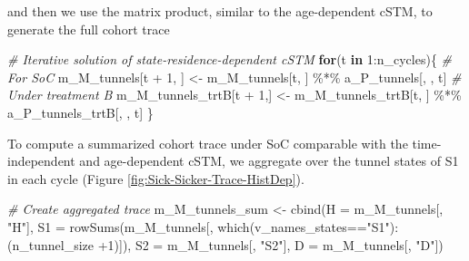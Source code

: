 \documentclass[
]{article}
\newenvironment{Shaded}{\begin{snugshade}}{\end{snugshade}}
\newcommand{\AttributeTok}[1]{\textcolor[rgb]{0.77,0.63,0.00}{#1}}
\newcommand{\CommentTok}[1]{\textcolor[rgb]{0.56,0.35,0.01}{\textit{#1}}}
\newcommand{\ControlFlowTok}[1]{\textcolor[rgb]{0.13,0.29,0.53}{\textbf{#1}}}
\newcommand{\DecValTok}[1]{\textcolor[rgb]{0.00,0.00,0.81}{#1}}
\newcommand{\FunctionTok}[1]{\textcolor[rgb]{0.00,0.00,0.00}{#1}}
\newcommand{\NormalTok}[1]{#1}
\newcommand{\OtherTok}[1]{\textcolor[rgb]{0.56,0.35,0.01}{#1}}
\newcommand{\SpecialCharTok}[1]{\textcolor[rgb]{0.00,0.00,0.00}{#1}}
\newcommand{\StringTok}[1]{\textcolor[rgb]{0.31,0.60,0.02}{#1}}
\begin{document}
and then we use the matrix product, similar to the age-dependent cSTM, to generate the full cohort trace

\begin{Shaded}
\begin{Highlighting}[]
\CommentTok{\# Iterative solution of state{-}residence{-}dependent cSTM}
\ControlFlowTok{for}\NormalTok{(t }\ControlFlowTok{in} \DecValTok{1}\SpecialCharTok{:}\NormalTok{n\_cycles)\{}
  \CommentTok{\# For SoC}
\NormalTok{  m\_M\_tunnels[t }\SpecialCharTok{+} \DecValTok{1}\NormalTok{, ] }\OtherTok{\textless{}{-}}\NormalTok{ m\_M\_tunnels[t, ] }\SpecialCharTok{\%*\%}\NormalTok{ a\_P\_tunnels[, , t]}
  \CommentTok{\# Under treatment B}
\NormalTok{  m\_M\_tunnels\_trtB[t }\SpecialCharTok{+} \DecValTok{1}\NormalTok{,] }\OtherTok{\textless{}{-}}\NormalTok{ m\_M\_tunnels\_trtB[t, ] }\SpecialCharTok{\%*\%}\NormalTok{ a\_P\_tunnels\_trtB[, , t]}
\NormalTok{\}}
\end{Highlighting}
\end{Shaded}

To compute a summarized cohort trace under SoC comparable with the time-independent and age-dependent cSTM, we aggregate over the tunnel states of S1 in each cycle (Figure \ref{fig:Sick-Sicker-Trace-HistDep}).

\begin{Shaded}
\begin{Highlighting}[]
\CommentTok{\# Create aggregated trace}
\NormalTok{m\_M\_tunnels\_sum }\OtherTok{\textless{}{-}} \FunctionTok{cbind}\NormalTok{(}\AttributeTok{H =}\NormalTok{ m\_M\_tunnels[, }\StringTok{"H"}\NormalTok{], }
                         \AttributeTok{S1 =} \FunctionTok{rowSums}\NormalTok{(m\_M\_tunnels[, }\FunctionTok{which}\NormalTok{(v\_names\_states}\SpecialCharTok{==}\StringTok{"S1"}\NormalTok{)}\SpecialCharTok{:}
\NormalTok{                                                    (n\_tunnel\_size }\SpecialCharTok{+}\DecValTok{1}\NormalTok{)]), }
                         \AttributeTok{S2 =}\NormalTok{ m\_M\_tunnels[, }\StringTok{"S2"}\NormalTok{],}
                         \AttributeTok{D =}\NormalTok{ m\_M\_tunnels[, }\StringTok{"D"}\NormalTok{])}
\end{Highlighting}
\end{Shaded}
\end{document}

